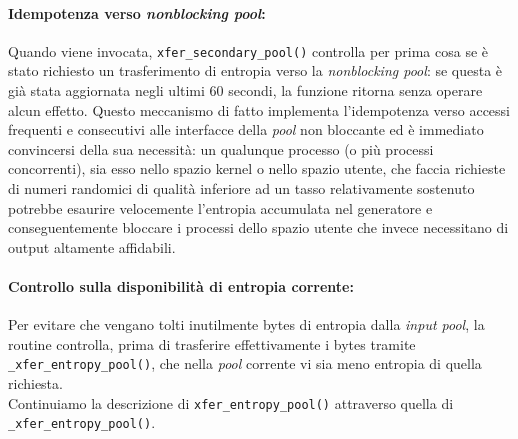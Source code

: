 \documentclass{article}
\begin{document}
 \paragraph{Idempotenza verso \emph{nonblocking pool}:}Quando viene invocata,
 \verb+xfer_secondary_pool()+ controlla per prima cosa se è stato richiesto un
 trasferimento di entropia verso la \emph{nonblocking pool}: se questa è già
 stata aggiornata negli ultimi 60 secondi, la funzione ritorna senza operare
 alcun effetto. Questo meccanismo di fatto implementa l'idempotenza verso
 accessi frequenti e consecutivi alle interfacce della \emph{pool} non
 bloccante ed è immediato convincersi della sua necessità: un qualunque processo
 (o più processi concorrenti), sia esso nello spazio
 kernel o nello spazio utente, che faccia richieste di numeri randomici di
 qualità inferiore ad un tasso relativamente sostenuto potrebbe esaurire
 velocemente l'entropia accumulata nel generatore e conseguentemente bloccare i
 processi dello spazio utente che invece necessitano di output altamente
 affidabili. 
 
 \paragraph{Controllo sulla disponibilità di entropia corrente:} Per evitare
 che vengano tolti inutilmente bytes di entropia dalla \emph{input pool}, la
 routine controlla, prima di trasferire effettivamente i bytes tramite
 \verb+_xfer_entropy_pool()+, che nella \emph{pool} corrente vi sia meno
 entropia di quella richiesta. \\Continuiamo la descrizione di
 \verb+xfer_entropy_pool()+ attraverso quella di \verb+_xfer_entropy_pool()+.
 
\end{document}
